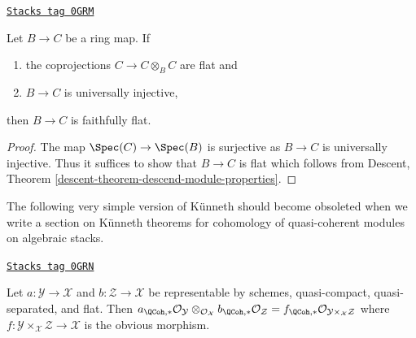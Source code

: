 \begin{lemma}[Flat]
\label{stacks-more-morphisms-lemma-flat}
\href{https://stacks.math.columbia.edu/tag/0GRM}{\texttt{Stacks tag 0GRM}}

Let $B \to C$ be a ring map. If
\begin{enumerate}
\item the coprojections $C \to C \otimes_B C$ are flat and
\item $B \to C$ is universally injective,
\end{enumerate}
then $B \to C$ is faithfully flat.
\end{lemma}

\begin{proof}
The map $\Spec(C) \to \Spec(B)$ is surjective as $B \to C$ is universally
injective. Thus it suffices to show that $B \to C$ is flat
which follows from
Descent, Theorem \ref{descent-theorem-descend-module-properties}.
\end{proof}

The following very simple version of K\"unneth should become
obsoleted when we write a section on K\"unneth theorems for
cohomology of quasi-coherent modules on algebraic stacks.

\begin{lemma}
\label{stacks-more-morphisms-lemma-easy-kunneth}
\href{https://stacks.math.columbia.edu/tag/0GRN}{\texttt{Stacks tag 0GRN}}

Let $a : \mathcal{Y} \to \mathcal{X}$ and $b : \mathcal{Z} \to \mathcal{X}$
be representable by schemes, quasi-compact, quasi-separated, and flat.
Then $a_{\QCoh, *}\mathcal{O}_\mathcal{Y}
\otimes_{\mathcal{O}_\mathcal{X}}
b_{\QCoh, *}\mathcal{O}_\mathcal{Z} =
f_{\QCoh, *}\mathcal{O}_{\mathcal{Y} \times_\mathcal{X} \mathcal{Z}}$
where $f : \mathcal{Y} \times_\mathcal{X} \mathcal{Z} \to \mathcal{X}$
is the obvious morphism.
\end{lemma}

